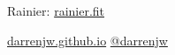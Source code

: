 \documentclass[mathserif,handout]{beamer}
\begin{document}
\begin{frame}
\begin{thebibliography}{}
    
    
%
    
  \end{thebibliography}

  \vspace*{0.8ex}

  Rainier:
  \alert{\url{rainier.fit}}


 \alert{\url{darrenjw.github.io}} \hfill \url{@darrenjw}
  
\end{frame}
\end{document}
